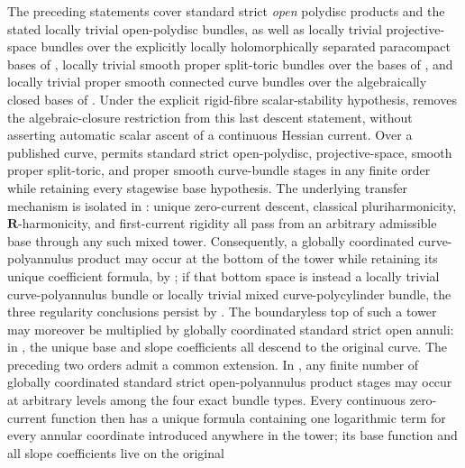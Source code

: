 The preceding statements cover standard strict \emph{open} polydisc products
and the stated locally trivial open-polydisc bundles, as well as locally
trivial projective-space bundles over the explicitly locally holomorphically
separated paracompact bases of
, locally trivial smooth proper
split-toric bundles over the bases of
, and locally
trivial proper smooth connected curve bundles over the algebraically closed bases of
.  Under the explicit
rigid-fibre scalar-stability hypothesis,
 removes the
algebraic-closure restriction from this last descent statement, without
asserting automatic scalar ascent of a continuous Hessian current.  Over a
published curve,  permits standard
strict open-polydisc, projective-space, smooth proper split-toric, and
proper smooth curve-bundle stages in any finite order while retaining every
stagewise base hypothesis.  The
underlying transfer mechanism is isolated in
: unique zero-current
descent, classical pluriharmonicity, \(\mathbf R\)-harmonicity, and
first-current rigidity all pass from an arbitrary admissible base through
any such mixed tower.  Consequently, a globally coordinated
curve-polyannulus product may occur at the bottom of the tower while
retaining its unique coefficient formula, by
; if that bottom space
is instead a locally trivial curve-polyannulus bundle or locally trivial
mixed curve-polycylinder bundle, the three regularity conclusions persist
by
.
The boundaryless top of such a tower may moreover be multiplied by globally
coordinated standard strict open annuli: in
, the unique base
and slope coefficients all descend to the original curve.  The preceding
two orders admit a common extension.  In
, any finite
number of globally coordinated standard strict open-polyannulus product
stages may occur at arbitrary levels among the four exact bundle types.
Every continuous zero-current function then has a unique formula containing
one logarithmic term for every annular coordinate introduced anywhere in the
tower; its base function and all slope coefficients live on the original
